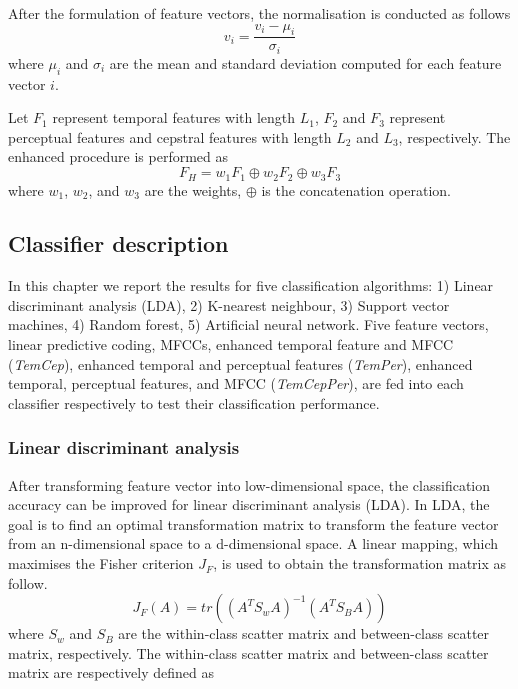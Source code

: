 After the formulation of feature vectors, the normalisation is conducted as follows
\begin{equation}
v_{i} = \frac{v_{i}-\mu_{i}}{\sigma_{i}}
\end{equation} 
where $\mu_{i}$ and $\sigma_{i}$ are the mean and standard deviation computed for each feature vector $i$.  

Let $F_{1}$ represent temporal features with length $L_{1}$, $F_{2}$ and $F_{3}$ represent perceptual features and cepstral features with length $L_{2}$ and $L_{3}$, respectively. The enhanced procedure is performed as
\begin{equation}
F_{H} = w_{1}F_{1}\oplus w_{2}F_{2} \oplus w_{3}F_{3}
\end{equation} 
where $w_{1}$, $w_{2}$, and $w_{3}$ are the weights, $\oplus$ is the concatenation operation.


\subsection{Classifier description}
In this chapter we report the results for five classification algorithms: 1) Linear discriminant analysis (LDA), 2) K-nearest neighbour, 3) Support vector machines, 4) Random forest, 5) Artificial neural network. Five feature vectors, linear predictive coding, MFCCs, enhanced temporal feature and MFCC (\textit{TemCep}), enhanced temporal and perceptual features (\textit{TemPer}), enhanced temporal, perceptual features, and MFCC (\textit{TemCepPer}), are fed into each classifier respectively to test their classification performance.

\subsubsection{Linear discriminant analysis}
After transforming feature vector into low-dimensional space, the classification accuracy can be improved for linear discriminant analysis (LDA). In LDA, the goal is to find an optimal transformation matrix to transform the feature vector from an n-dimensional space to a d-dimensional space. A linear mapping, which maximises the Fisher criterion $J_{F}$, is used to obtain the transformation matrix as follow.
\begin{equation}
J_{F}(A)=tr((A^{T}S_{w}A)^{-1}(A^{T}S_{B}A))
\end{equation}
where $S_{w}$ and $S_{B}$ are the within-class scatter matrix and between-class scatter matrix, respectively. The within-class scatter matrix and between-class scatter matrix are respectively defined as 

